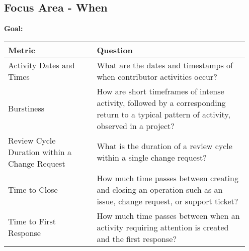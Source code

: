 
\subsection{Focus Area - When}
\textbf{Goal:} 
\begin{table}[ht!]
    \centering
    \begin{tabular}{|p{0.35\linewidth} | p{0.6\linewidth}|}
        \hline
        \hfil \textbf{Metric}  & \hfil \textbf{Question} \\
        \hline
		Activity Dates and Times & What are the dates and timestamps of when contributor activities occur? \\ 
		\hline
		Burstiness & How are short timeframes of intense activity, followed by a corresponding return to a typical pattern of activity, observed in a project? \\ 
		\hline
		Review Cycle Duration within a Change Request & What is the duration of a review cycle within a single change request? \\ 
		\hline
		Time to Close & How much time passes between creating and closing an operation such as an issue, change request, or support ticket? \\ 
		\hline
		Time to First Response & How much time passes between when an activity requiring attention is created and the first response? \\ 
		\hline
    \end{tabular}
\end{table}

 
 
 
 
 
